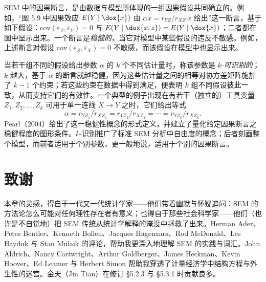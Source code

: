 SEM 中的因果断言，是由数据与模型所体现的一组因果假设共同确立的。例如，“图 5.9 中因果效应 $E(Y\mid \dox{x})$ 由 $\alpha x=r_{YZ}/r_{XZ}\,x$ 给出”这一断言，基于如下假设：$\mathrm{cov}(\varepsilon_Z,\varepsilon_Y)=0$ 与 $E(Y\mid \dox{x,z})=E(Y\mid \dox{x})$；二者都在图中显示出来。一个断言是\emph{稳健的}，当它对模型中某些假设的违反不敏感。例如，上述断言对假设 $\mathrm{cov}(\varepsilon_Z,\varepsilon_X)=0$ 不敏感，而该假设在模型中也显示出来。

当若干组不同的假设给出参数 $\alpha$ 的 $k$ 个不同估计量时，称该参数是 $k$-\emph{可识别的}；$k$ 越大，基于 $\alpha$ 的断言就越稳健，因为这些估计量之间的相等对协方差矩阵施加了 $k-1$ 个约束；若这些约束在数据中得到满足，便表明 $k$ 组不同假设彼此一致，从而支持它们的有效性。一个典型的例子出现在有若干（独立的）工具变量 $Z_1,Z_2,\dots,Z_k$ 可用于单一连线 $X\to Y$ 之时，它们给出等式
\[
\alpha=r_{YZ_1}/r_{XZ_1}=r_{YZ_2}/r_{XZ_2}=\cdots=r_{YZ_k}/r_{XZ_k}.
\]
Pearl（2004）给出了这一稳健性概念的形式定义，并建立了量化给定因果断言之稳健程度的图形条件。$k$-识别推广了标准 SEM 分析中自由度的概念；后者刻画整个模型，而前者适用于个别参数，更一般地说，适用于个别的因果断言。

\section*{致谢}

本章的灵感，得自于一代又一代统计学家——他们带着幽默与怀疑追问：SEM 的方法论怎么可能对任何理性存在者有意义；也得自于那些社会科学家——他们（也许是不自觉地）把 SEM 传统从统计学解释的淹没中拯救了出来。Herman Ader、Peter Bentler、Kenneth Bollen、Jacques Hagenaars、Rod McDonald、Les Hayduk 与 Stan Mulaik 的评论，帮助我更深入地理解 SEM 的实践与词汇。John Aldrich、Nancy Cartwright、Arthur Goldberger、James Heckman、Kevin Hoover、Ed Leamer 与 Herbert Simon 帮助我穿透了计量经济学中结构方程与外生性的迷宫。金天（Jin Tian）在修订 \S 5.2.3 与 \S 5.3.1 时贡献良多。
